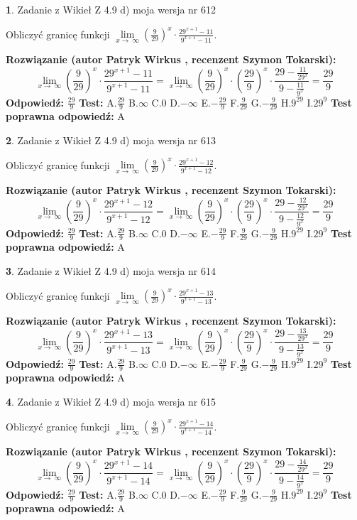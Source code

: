\documentclass[12pt, a4paper]{article}
\theoremstyle{definition} %
\newtheorem{zad}{}
\newcommand{\zadStart}[1]{\begin{zad}#1\newline}
\newcommand{\zadStop}{\end{zad}}
\newcommand{\rozwStart}[2]{\noindent \textbf{Rozwiązanie (autor #1 , recenzent #2): }\newline}
\newcommand{\rozwStop}{\newline}
\newcommand{\odpStart}{\noindent \textbf{Odpowiedź:}\newline}
\newcommand{\odpStop}{\newline}
\newcommand{\testStart}{\noindent \textbf{Test:}\newline}
\newcommand{\testStop}{\newline}
\newcommand{\kluczStart}{\noindent \textbf{Test poprawna odpowiedź:}\newline}
\newcommand{\kluczStop}{\newline}
\begin{document}
\zadStart{Zadanie z Wikieł Z 4.9 d) moja wersja nr 612}


Obliczyć granicę funkcji  $\lim\limits_{x\to\ \infty}(\frac{9}{29})^{x}\cdot\frac{29^{x+1}-11}{9^{x+1}-11}$.
\zadStop
\rozwStart{Patryk Wirkus}{Szymon Tokarski}
$$\lim\limits_{x\to\ \infty}(\frac{9}{29})^{x}\cdot\frac{29^{x+1}-11}{9^{x+1}-11}=\lim\limits_{x\to\ \infty}(\frac{9}{29})^{x}\cdot(\frac{29}{9})^{x} \cdot \frac{29-\frac{11}{29^{x}}}{9-\frac{11}{9^{x}}} = \frac{29}{9}$$
\rozwStop
\odpStart
$\frac{29}{9}$
\odpStop
\testStart
A.$\frac{29}{9}$ B.$\infty$ C.$0$ D.$-\infty$ E.$-\frac{29}{9}$
F.$\frac{9}{29}$ G.$-\frac{9}{29}$
H.$9^{29}$
I.$29^{9}$
\testStop
\kluczStart
A
\kluczStop



\zadStart{Zadanie z Wikieł Z 4.9 d) moja wersja nr 613}


Obliczyć granicę funkcji  $\lim\limits_{x\to\ \infty}(\frac{9}{29})^{x}\cdot\frac{29^{x+1}-12}{9^{x+1}-12}$.
\zadStop
\rozwStart{Patryk Wirkus}{Szymon Tokarski}
$$\lim\limits_{x\to\ \infty}(\frac{9}{29})^{x}\cdot\frac{29^{x+1}-12}{9^{x+1}-12}=\lim\limits_{x\to\ \infty}(\frac{9}{29})^{x}\cdot(\frac{29}{9})^{x} \cdot \frac{29-\frac{12}{29^{x}}}{9-\frac{12}{9^{x}}} = \frac{29}{9}$$
\rozwStop
\odpStart
$\frac{29}{9}$
\odpStop
\testStart
A.$\frac{29}{9}$ B.$\infty$ C.$0$ D.$-\infty$ E.$-\frac{29}{9}$
F.$\frac{9}{29}$ G.$-\frac{9}{29}$
H.$9^{29}$
I.$29^{9}$
\testStop
\kluczStart
A
\kluczStop



\zadStart{Zadanie z Wikieł Z 4.9 d) moja wersja nr 614}


Obliczyć granicę funkcji  $\lim\limits_{x\to\ \infty}(\frac{9}{29})^{x}\cdot\frac{29^{x+1}-13}{9^{x+1}-13}$.
\zadStop
\rozwStart{Patryk Wirkus}{Szymon Tokarski}
$$\lim\limits_{x\to\ \infty}(\frac{9}{29})^{x}\cdot\frac{29^{x+1}-13}{9^{x+1}-13}=\lim\limits_{x\to\ \infty}(\frac{9}{29})^{x}\cdot(\frac{29}{9})^{x} \cdot \frac{29-\frac{13}{29^{x}}}{9-\frac{13}{9^{x}}} = \frac{29}{9}$$
\rozwStop
\odpStart
$\frac{29}{9}$
\odpStop
\testStart
A.$\frac{29}{9}$ B.$\infty$ C.$0$ D.$-\infty$ E.$-\frac{29}{9}$
F.$\frac{9}{29}$ G.$-\frac{9}{29}$
H.$9^{29}$
I.$29^{9}$
\testStop
\kluczStart
A
\kluczStop



\zadStart{Zadanie z Wikieł Z 4.9 d) moja wersja nr 615}


Obliczyć granicę funkcji  $\lim\limits_{x\to\ \infty}(\frac{9}{29})^{x}\cdot\frac{29^{x+1}-14}{9^{x+1}-14}$.
\zadStop
\rozwStart{Patryk Wirkus}{Szymon Tokarski}
$$\lim\limits_{x\to\ \infty}(\frac{9}{29})^{x}\cdot\frac{29^{x+1}-14}{9^{x+1}-14}=\lim\limits_{x\to\ \infty}(\frac{9}{29})^{x}\cdot(\frac{29}{9})^{x} \cdot \frac{29-\frac{14}{29^{x}}}{9-\frac{14}{9^{x}}} = \frac{29}{9}$$
\rozwStop
\odpStart
$\frac{29}{9}$
\odpStop
\testStart
A.$\frac{29}{9}$ B.$\infty$ C.$0$ D.$-\infty$ E.$-\frac{29}{9}$
F.$\frac{9}{29}$ G.$-\frac{9}{29}$
H.$9^{29}$
I.$29^{9}$
\testStop
\kluczStart
A
\kluczStop
\end{document}
